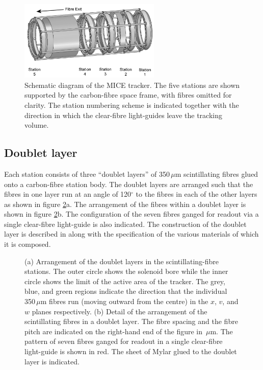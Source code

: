 \begin{figure}
  \includegraphics[width=0.6\textwidth]{detectors/tracker/02-Definitions/Figures/StnNum.pdf}
  \caption{Schematic diagram of the MICE tracker. The five stations are shown supported by the carbon-fibre space frame, with fibres omitted for clarity. The station numbering scheme is indicated together with the direction in which the clear-fibre light-guides leave the tracking volume.}
  \label{Fig:StnNum}
\end{figure}

\subsection{Doublet layer}
\label{SubSect:DblLyr}

Each station consists of three ``doublet layers'' of 350\,$\mu$m scintillating fibres glued onto a carbon-fibre station body.   The doublet layers are arranged such that the fibres in one layer run at an angle of 120$^\circ$ to the fibres in each of the other layers as shown in figure \ref{Fig:DblLyr}a.   The arrangement of the fibres within a doublet layer is shown in figure \ref{Fig:DblLyr}b.   The configuration of the seven fibres ganged for readout via a single clear-fibre light-guide is also indicated. The construction of the doublet layer is described in \cite{TrackerPaper} along with the specification of the various materials of which it is composed.
\begin{figure}
  \caption{(a) Arrangement of the doublet layers in the scintillating-fibre  stations. The outer circle shows the solenoid bore while the inner circle shows the limit of the active area of the tracker. The grey, blue, and green regions indicate the direction that the individual 350\,$\mu$m fibres run (moving outward from the centre) in the $x$, $v$, and $w$ planes respectively. (b) Detail of the arrangement of the scintillating fibres in a doublet layer. The fibre spacing and the fibre pitch are indicated on the right-hand end of the figure in \,$\mu$m. The pattern of seven fibres ganged for readout in a single clear-fibre light-guide is shown in red. The sheet of Mylar glued to the doublet layer is indicated.}
  \label{Fig:DblLyr}
\end{figure}

